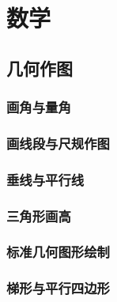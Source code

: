 





\tableofcontents

\newpage

\part{数学}

\chapter{几何作图}

\section{画角与量角}


\section{画线段与尺规作图}


\section{垂线与平行线}


\section{三角形画高}


\section{标准几何图形绘制}


\section{梯形与平行四边形}


